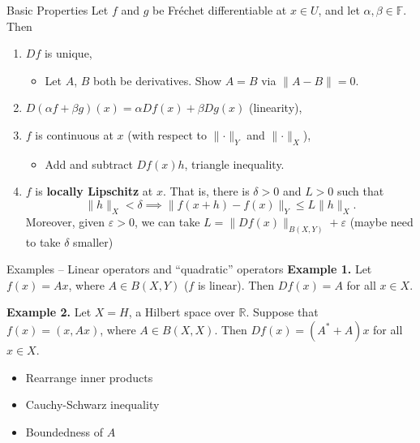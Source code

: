 \documentclass[]{beamer}
\begin{document}
	\begin{frame}{Basic Properties}
		Let $f$ and $g$ be Fréchet differentiable at $x \in U$, and let $\alpha, \beta \in \mathbb{F}$. Then
		\vfill
		\begin{enumerate}
			\item $Df$ is unique,
			\begin{itemize}
				\item Let $A$, $B$ both be derivatives. Show $A = B$ via $\lVert A - B\rVert = 0$.
			\end{itemize}
			\vfill
			\item $D(\alpha f + \beta g)(x) = \alpha Df(x) + \beta Dg(x)$ (linearity),
			\vfill
			\item $f$ is continuous at $x$ (with respect to $\lVert \cdot \rVert_Y$ and $\lVert \cdot \rVert_X$),
			\begin{itemize}
				\item Add and subtract $Df(x)h$, triangle inequality.
			\end{itemize}
			\vfill 
			\item $f$ is \textbf{locally Lipschitz} at $x$. That is, there is $\delta > 0$ and $L > 0$ such that
			\begin{equation*}
				\lVert h \rVert_X < \delta \implies \lVert f(x+h) -f(x)\rVert_Y \le L\lVert h\rVert_X.
			\end{equation*}
			Moreover, given $\varepsilon > 0$, we can take $L = \lVert Df(x)\rVert_{B(X,Y)} + \varepsilon$ (maybe need to take $\delta$ smaller)
		\end{enumerate}
	\end{frame}
	
	\begin{frame}{Examples -- Linear operators and ``quadratic'' operators}
		\textbf{Example 1.} Let $f(x) = Ax$, where $A \in B(X,Y)$ ($f$ is linear). Then $Df(x) = A$ for all $x \in X$.
		\vfill
		
		\textbf{Example 2.} Let $X = H$, a Hilbert space over $\mathbb{R}$. Suppose that $f(x) = (x, Ax)$, where $A \in B(X,X)$. Then $Df(x) = (A^* + A)x$ for all $x \in X$.
		
		\begin{itemize}
			\item Rearrange inner products
			\item Cauchy-Schwarz inequality
			\item Boundedness of $A$
		\end{itemize}
	\end{frame}
	
\end{document}
